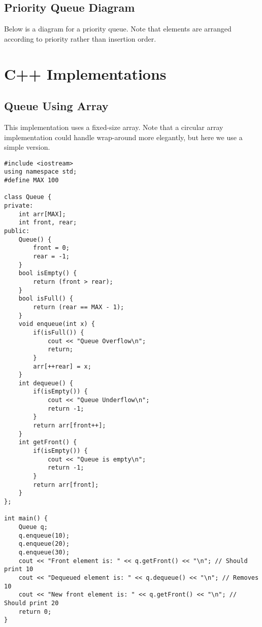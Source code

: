 \subsection{Priority Queue Diagram}
Below is a diagram for a priority queue. Note that elements are arranged according to priority rather than insertion order.

\begin{center}
\end{center}

\section{C++ Implementations}

\subsection{Queue Using Array}
This implementation uses a fixed-size array. Note that a circular array implementation could handle wrap-around more elegantly, but here we use a simple version.

\begin{lstlisting}[caption={C++ implementation of a Queue using an Array}]
#include <iostream>
using namespace std;
#define MAX 100

class Queue {
private:
    int arr[MAX];
    int front, rear;
public:
    Queue() {
        front = 0;
        rear = -1;
    }
    bool isEmpty() {
        return (front > rear);
    }
    bool isFull() {
        return (rear == MAX - 1);
    }
    void enqueue(int x) {
        if(isFull()) {
            cout << "Queue Overflow\n";
            return;
        }
        arr[++rear] = x;
    }
    int dequeue() {
        if(isEmpty()) {
            cout << "Queue Underflow\n";
            return -1;
        }
        return arr[front++];
    }
    int getFront() {
        if(isEmpty()) {
            cout << "Queue is empty\n";
            return -1;
        }
        return arr[front];
    }
};

int main() {
    Queue q;
    q.enqueue(10);
    q.enqueue(20);
    q.enqueue(30);
    cout << "Front element is: " << q.getFront() << "\n"; // Should print 10
    cout << "Dequeued element is: " << q.dequeue() << "\n"; // Removes 10
    cout << "New front element is: " << q.getFront() << "\n"; // Should print 20
    return 0;
}
\end{lstlisting}

